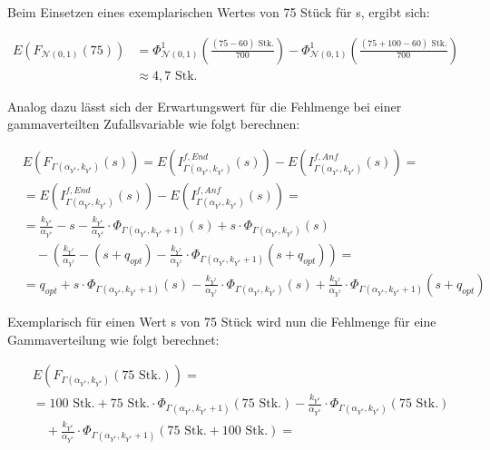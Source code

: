 Beim Einsetzen eines exemplarischen Wertes von 75 Stück für s, ergibt sich:

\begin{align*}
E\left(F_{\mathcal{N}(0,1)}(75)\right)&=\Phi^1_{\mathcal{N}(0,1)}\left(\frac{(75-60)\text{ Stk.}}{700}\right)-\Phi^1_{\mathcal{N}(0,1)}\left(\frac{(75+100-60)\text{ Stk.}}{700}\right)\\
&\approx4,7\text{ Stk.}
\end{align*}

\pagebreak
Analog dazu lässt sich der Erwartungswert für die Fehlmenge bei einer gammaverteilten Zufallsvariable wie folgt berechnen:

\begin{align*}
&E\left(F_{\Gamma\left(\alpha_{Y^*},k_{Y^*}\right)}(s)\right)= E\left(I^{f,End}_{\Gamma\left(\alpha_{Y^*},k_{Y^*}\right)}\left(s\right)\right)-E\left(I^{f,Anf}_{\Gamma\left(\alpha_{Y^*},k_{Y^*}\right)}\left(s\right)\right) = \\
&= E\left(I^{f,End}_{\Gamma\left(\alpha_{Y^*},k_{Y^*}\right)}\left(s\right)\right)-E\left(I^{f,Anf}_{\Gamma\left(\alpha_{Y^*},k_{Y^*}\right)}\left(s\right)\right)= \\
&= \frac{k_{Y^*}}{\alpha_{Y^*}}-s-\frac{k_{Y^*}}{\alpha_{Y^*}}\cdot \Phi_{\Gamma\left(\alpha_{Y^*},k_{Y^*}+1\right)}\left(s\right)+s\cdot \Phi_{\Gamma\left(\alpha_{Y^*},k_{Y^*}\right)}\left(s\right) \\
&\quad - \left(\frac{k_{Y^*}}{\alpha_{Y^*}}-\left(s+q_{opt}\right)-\frac{k_{Y^*}}{\alpha_{Y^*}}\cdot \Phi_{\Gamma\left(\alpha_{Y^*},k_{Y^*}+1\right)}\left(s+q_{opt}\right)\right) = \\
&= q_{opt}+s \cdot \Phi_{\Gamma\left(\alpha_{Y^*},k_{Y^*}+1\right)}\left(s\right)- \frac{k_{Y^*}}{\alpha_{Y^*}} \cdot \Phi_{\Gamma\left(\alpha_{Y^*},k_{Y^*}\right)}\left(s\right) + \frac{k_{Y^*}}{\alpha_{Y^*}} \cdot \Phi_{\Gamma\left(\alpha_{Y^*},k_{Y^*}+1\right)}\left(s+q_{opt}\right)
\end{align*}


Exemplarisch für einen Wert s von 75 Stück wird nun die Fehlmenge für eine Gammaverteilung wie folgt berechnet:

\begin{align*}
&E\left(F_{\Gamma\left(\alpha_{Y^*},k_{Y^*}\right)}(75 \text{ Stk.})\right)= \\
&= 100\text{ Stk.}+75\text{ Stk.} \cdot \Phi_{\Gamma\left(\alpha_{Y^*},k_{Y^*}+1\right)}\left(75\text{ Stk.}\right)- \frac{k_{Y^*}}{\alpha_{Y^*}} \cdot \Phi_{\Gamma\left(\alpha_{Y^*},k_{Y^*}\right)}\left(75\text{ Stk.}\right) \\
&\quad + \frac{k_{Y^*}}{\alpha_{Y^*}} \cdot \Phi_{\Gamma\left(\alpha_{Y^*},k_{Y^*}+1\right)}\left(75\text{ Stk.}+100\text{ Stk.}\right)=
\end{align*}
